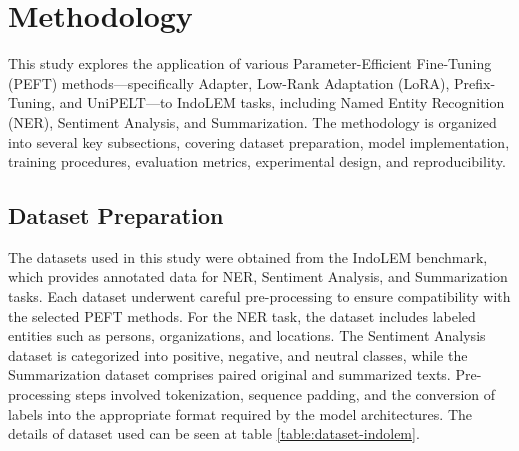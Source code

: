 \section{Methodology}

This study explores the application of various Parameter-Efficient Fine-Tuning (PEFT) methods—specifically Adapter, Low-Rank Adaptation (LoRA), Prefix-Tuning, and UniPELT—to IndoLEM tasks, including Named Entity Recognition (NER), Sentiment Analysis, and Summarization. The methodology is organized into several key subsections, covering dataset preparation, model implementation, training procedures, evaluation metrics, experimental design, and reproducibility.

\subsection{Dataset Preparation}

\begin{table}[htbp]
    \vspace{0.25cm}
    \centering
    \caption{Dataset Details}
    \label{table:dataset-indolem}
\end{table}

The datasets used in this study were obtained from the IndoLEM benchmark, which provides annotated data for NER, Sentiment Analysis, and Summarization tasks. Each dataset underwent careful pre-processing to ensure compatibility with the selected PEFT methods. For the NER task, the dataset includes labeled entities such as persons, organizations, and locations. The Sentiment Analysis dataset is categorized into positive, negative, and neutral classes, while the Summarization dataset comprises paired original and summarized texts. Pre-processing steps involved tokenization, sequence padding, and the conversion of labels into the appropriate format required by the model architectures. The details of dataset used can be seen at table \ref{table:dataset-indolem}.

